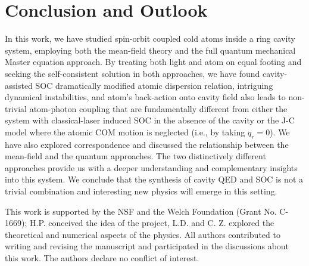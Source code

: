 \documentclass[atoms,article,submit,moreauthors,pdftex,12pt,a4paper]{mdpi}
\begin{document}
\section{Conclusion and Outlook} \label{conclusion}

In this work, we have studied spin-orbit coupled cold atoms inside a ring cavity system, employing both the mean-field theory and the full quantum mechanical Master equation approach. By treating both light and atom on equal footing and seeking the self-consistent solution in both approaches, we have found cavity-assisted SOC dramatically modified atomic dispersion relation, intriguing dynamical instabilities, and atom's back-action onto cavity field also leads to non-trivial atom-photon coupling that are fundamentally different from either the system with classical-laser induced SOC in the absence of the cavity or the J-C model where the atomic COM motion is neglected (i.e., by taking $q_r=0$). We have also explored correspondence and discussed the relationship between the mean-field and the quantum approaches. The two distinctively different approaches provide us with a deeper understanding and complementary insights into this system. We conclude that the synthesis of cavity QED and SOC is not a trivial combination and interesting new physics will emerge in this setting.



This work is supported by the NSF and the Welch Foundation (Grant No. C-1669);
H.P. conceived the idea of the project, L.D. and C. Z. explored the theoretical and numerical aspects of the physics. All authors contributed to writing and revising the manuscript and participated in the discussions about this work.
The authors declare no conflict of interest. 
\end{document}
